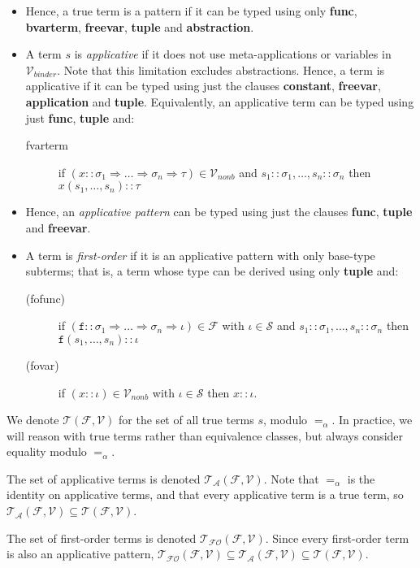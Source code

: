 \documentclass{lmcs}
\theoremstyle{theorem}\newtheorem{theorem}{Theorem}
\theoremstyle{theorem}\newtheorem{lemma}[theorem]{Lemma}
\theoremstyle{theorem}\newtheorem{corollary}[theorem]{Corollary}
\theoremstyle{definition}\newtheorem{definition}[theorem]{Definition}
\theoremstyle{definition}\newtheorem{example}[theorem]{Example}
\newcommand{\F}{\mathcal{F}}
\newcommand{\V}{\mathcal{V}}
\newcommand{\Vfree}{\mathcal{V}_{\mathit{nonb}}}
\newcommand{\Vbound}{\mathcal{V}_{\mathit{binder}}}
\newcommand{\Sorts}{\mathcal{S}}
\newcommand{\Terms}{\mathcal{T}}
\newcommand{\ATerms}{\mathcal{T}_{\mathcal{A}}}
\newcommand{\FOTerms}{\mathcal{T}_{\mathcal{FO}}}
\newcommand{\asort}{\iota}
\newcommand{\atype}{\sigma}
\newcommand{\btype}{\tau}
\newcommand{\identifier}[1]{\mathtt{#1}}
\newcommand{\afun}{\identifier{f}}
\newcommand{\avar}{x}
\newcommand{\clause}[1]{\textbf{#1}}
\newcommand{\arrtype}{\Rightarrow}
\begin{document}
\begin{itemize}
\item Hence, a true term is a pattern if it can be typed using only
  \clause{func}, \clause{bvarterm}, \clause{freevar}, \clause{tuple} and
  \clause{abstraction}.

\item A term $s$ is \emph{applicative} if it does not use meta-applications or
  variables in $\Vbound$.  Note that this limitation excludes abstractions.
  Hence, a term is applicative if it can be typed using just the clauses
  \clause{constant}, \clause{freevar}, \clause{application} and \clause{tuple}.
  Equivalently, an applicative term can be typed using just \clause{func},
  \clause{tuple} and:
  \begin{description}
  \item[fvarterm] if $(\avar :: \atype_1 \arrtype \dots \arrtype \atype_n
    \arrtype \btype) \in \Vfree$ and $s_1 :: \atype_1,\dots,s_n :: \atype_n$
    then $\avar(s_1,\dots,s_n) :: \btype$
  \end{description}

\item Hence, an \emph{applicative pattern} can be typed using just the clauses
  \clause{func}, \clause{tuple} and \clause{freevar}.
\item A term is \emph{first-order} if it is an applicative pattern with only
  base-type subterms; that is, a term whose type can be derived using only
  \clause{tuple} and:
  \begin{description}
  \item[(fofunc)] if $(\afun :: \atype_1 \arrtype \dots \arrtype \atype_n
    \arrtype \asort) \in \F$ with $\asort \in \Sorts$ and $s_1 :: \atype_1,
    \dots,s_n :: \atype_n$ then $\afun(s_1,\dots,s_n) :: \asort$
  \item[(fovar)] if $(\avar :: \asort) \in \Vfree$ with $\asort \in \Sorts$ then
    $\avar :: \asort$.
  \end{description}
\end{itemize}

We denote $\Terms(\F,\V)$ for the set of all true terms $s$, modulo $=_\alpha$.
In practice, we will reason with true terms rather than equivalence classes, but
always consider equality modulo $=_\alpha$.

The set of applicative terms is denoted $\ATerms(\F,\V)$.  Note that $=_\alpha$
is the identity on applicative terms, and that every applicative term is a true
term, so $\ATerms(\F,\V) \subseteq \Terms(\F,\V)$.

The set of first-order terms is denoted $\FOTerms(\F,\V)$.  Since every
first-order term is also an applicative pattern, $\FOTerms(\F,\V) \subseteq
\ATerms(\F,\V) \subseteq \Terms(\F,\V)$.
\end{document}
